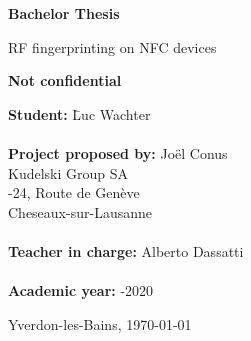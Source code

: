 
\begin{titlepage}
  \thispagestyle{firstpage}
  \begin{center}
    \vspace*{3cm}

    \Huge
    \textbf{Bachelor Thesis}

    \vspace{1cm}
    \Huge
    RF fingerprinting on NFC devices

    \vspace{0.2cm}
    \Large
    \textbf{Not confidential}
  \end{center}

  \vspace{8cm}
  \begin{tabbing}
    \linespread{3}\textbf{Student:} \hspace{12em} \= Luc Wachter\\\\

    \textbf{Project proposed by:} \> Joël Conus\\
    \> Kudelski Group SA\\
    -24, Route de Genève\\
     Cheseaux-sur-Lausanne\\\\

    \textbf{Teacher in charge:} \> Alberto Dassatti\\\\

    \textbf{Academic year:} -2020
  \end{tabbing}

  \vspace{2.5cm}
  \begin{flushright}
    Yverdon-les-Bains, \today
  \end{flushright}
\end{titlepage}
